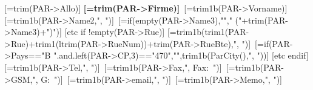 
[=trim(PAR->Allo)] \textbf{[=trim(PAR->Firme)]}\
[=trim1b(PAR->Vorname)][=trim1b(PAR->Name2,", ")]\
[=if(empty(PAR->Name3),""," ("+trim(PAR->Name3)+")")]
[etc if !empty(PAR->Rue)]
[=trim1b(trim1(PAR->Rue)+trim1(ltrim(PAR->RueNum))+trim(PAR->RueBte),", ")]\
[=if(PAR->Pays=="B  ".and.left(PAR->CP,3)=="470","",trim1b(ParCity(),", "))]
[etc endif]
[=trim1b(PAR->Tel,", ")]\
[=trim1b(PAR->Fax,", Fax:~")]\
[=trim1b(PAR->GSM,", G:~")]\
[=trim1b(PAR->email,", ")]\
[=trim1b(PAR->Memo,", ")]

